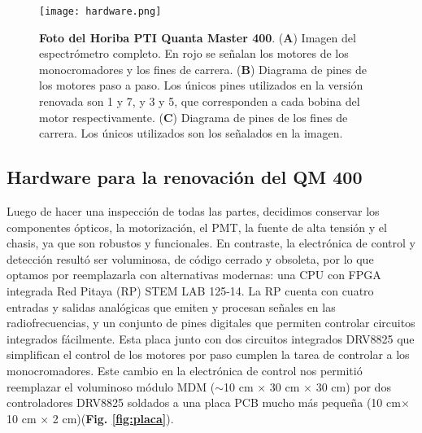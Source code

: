 \begin{figure}[h]
     \centering
     \texttt{[image: hardware.png]}
     \caption{\textbf{Foto del Horiba PTI Quanta Master 400}. 
    (\textbf{A}) Imagen del espectrómetro completo. En rojo se señalan los motores de los monocromadores y los fines de carrera. (\textbf{B}) Diagrama de pines de los motores paso a paso. Los únicos pines utilizados en la versión renovada son 1 y 7, y 3 y 5, que corresponden a cada bobina del motor respectivamente. (\textbf{C}) Diagrama de pines de los fines de carrera. Los únicos utilizados son los señalados en la imagen.}
     \label{fig:hardware}
\end{figure}


\subsection{Hardware para la renovación del QM 400}

Luego de hacer una inspección de todas las partes, decidimos conservar los componentes ópticos, la motorización, el PMT, la fuente de alta tensión y el chasis, ya que son robustos y funcionales.  
En contraste, la electrónica de control y detección resultó ser voluminosa, de código cerrado y obsoleta, por lo que optamos por reemplazarla con alternativas modernas: una CPU con FPGA integrada Red Pitaya (RP) STEM LAB 125-14.
La RP cuenta con cuatro entradas y salidas analógicas que emiten y procesan señales en las radiofrecuencias, y un conjunto de pines digitales que permiten controlar circuitos integrados fácilmente.
Esta placa junto con dos circuitos integrados DRV8825 que simplifican el control de los motores por paso cumplen la tarea de controlar a los monocromadores.
Este cambio en la electrónica de control nos permitió reemplazar el voluminoso módulo MDM ($\sim$10 cm $\times$ 30 cm $\times$ 30 cm) por dos controladores DRV8825 soldados a una placa PCB mucho más pequeña (10 cm$\times$ 10 cm $\times$ 2 cm)(\textbf{Fig. \ref{fig:placa}}).


